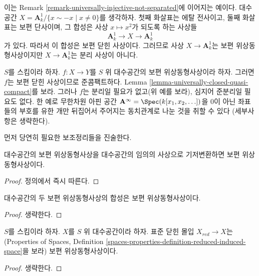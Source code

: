 \begin{example}
\label{example-universal-homeomorphism}
이는 Remark \ref{remark-universally-injective-not-separated}에 이어지는
예이다. 대수공간
$X = \mathbf{A}^1_k/\{x \sim -x \mid x \not = 0\}$를 생각하자. 첫째
화살표는 에탈 전사이고, 둘째 화살표는 보편 단사이며, 그 합성은 사상
$x \mapsto x^2$가 되도록 하는 사상들
$$
\mathbf{A}^1_k \longrightarrow X \longrightarrow \mathbf{A}^1_k
$$
가 있다. 따라서 이 합성은 보편 닫힌 사상이다. 그러므로 사상
$X \to \mathbf{A}^1_k$는 보편 위상동형사상이지만
$X \to \mathbf{A}^1_k$는 분리 사상이 아니다.
\end{example}

\noindent
$S$를 스킴이라 하자. $f : X \to Y$를 $S$ 위 대수공간의 보편
위상동형사상이라 하자. 그러면 $f$는 보편 닫힌 사상이므로 준콤팩트하다.
Lemma \ref{lemma-universally-closed-quasi-compact}를 보라. 그러나 $f$는
분리일 필요가 없고(위 예를 보라), 심지어 준분리일 필요도 없다. 한
예로 무한차원 아핀 공간
$\mathbf{A}^\infty = \Spec(k[x_1, x_2, \ldots])$을 0이 아닌 좌표들의
부호를 유한 개만 뒤집어서 주어지는 동치관계로 나눈 것을 취할 수 있다
(세부사항은 생략한다).

\medskip\noindent
먼저 당연히 필요한 보조정리들을 진술한다.

\begin{lemma}
\label{lemma-base-change-universal-homeomorphism}
대수공간의 보편 위상동형사상을 대수공간의 임의의 사상으로
기저변환하면 보편 위상동형사상이다.
\end{lemma}

\begin{proof}
정의에서 즉시 따른다.
\end{proof}

\begin{lemma}
\label{lemma-composition-universal-homeomorphism}
대수공간의 두 보편 위상동형사상의 합성은 보편 위상동형사상이다.
\end{lemma}

\begin{proof}
생략한다.
\end{proof}

\begin{lemma}
\label{lemma-reduction-universal-homeomorphism}
$S$를 스킴이라 하자. $X$를 $S$ 위 대수공간이라 하자. 표준 닫힌 몰입
$X_{red} \to X$는(Properties of Spaces, Definition
\ref{spaces-properties-definition-reduced-induced-space}을 보라) 보편
위상동형사상이다.
\end{lemma}

\begin{proof}
생략한다.
\end{proof}

